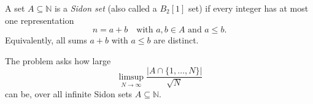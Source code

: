 A set $A\subseteq\mathbb N$ is a \emph{Sidon set} (also called a $B_2[1]$ set) if every integer has at most one representation
\[
n=a+b\quad\text{with }a,b\in A\text{ and }a\le b.
\]
Equivalently, all sums $a+b$ with $a\le b$ are distinct.

The problem asks how large
\[
\limsup_{N\to\infty}\frac{|A\cap\{1,\dots,N\}|}{\sqrt{N}}
\]
can be, over all infinite Sidon sets $A\subseteq\mathbb N$.

